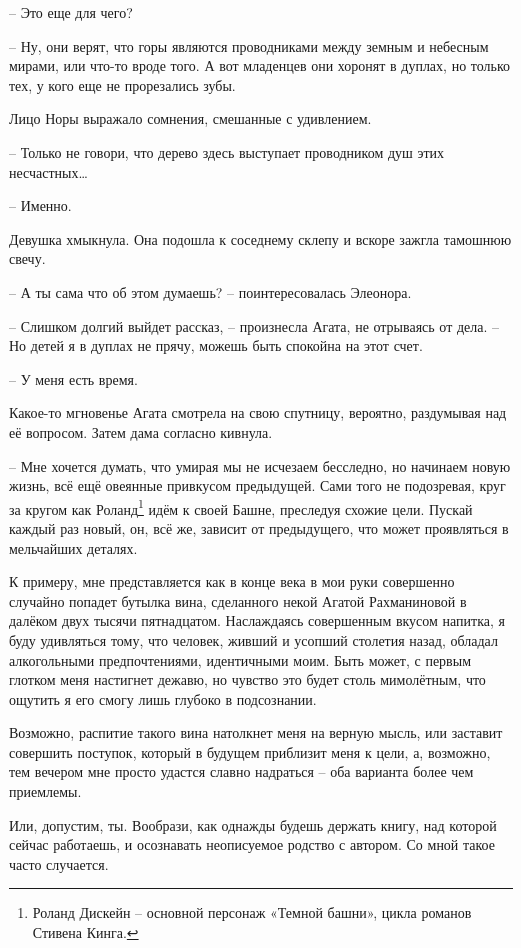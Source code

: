 \documentclass[
  a5paperpaper,
  DIV=11,
  numbers=noendperiod]{scrreprt}
\begin{document}
-- Это еще для чего?

-- Ну, они верят, что горы являются проводниками между земным и небесным
мирами, или что-то вроде того. А вот младенцев они хоронят в дуплах, но
только тех, у кого еще не прорезались зубы.

Лицо Норы выражало сомнения, смешанные с удивлением.

-- Только не говори, что дерево здесь выступает проводником душ этих
несчастных\ldots{}

-- Именно.

Девушка хмыкнула. Она подошла к соседнему склепу и вскоре зажгла
тамошнюю свечу.

-- А ты сама что об этом думаешь? -- поинтересовалась Элеонора.

-- Слишком долгий выйдет рассказ, -- произнесла Агата, не отрываясь от
дела. -- Но детей я в дуплах не прячу, можешь быть спокойна на этот
счет.

-- У меня есть время.

Какое-то мгновенье Агата смотрела на свою спутницу, вероятно, раздумывая
над её вопросом. Затем дама согласно кивнула.

-- Мне хочется думать, что умирая мы не исчезаем бесследно, но начинаем
новую жизнь, всё ещё овеянные привкусом предыдущей. Сами того не
подозревая, круг за кругом как Роланд\footnote{Роланд Дискейн --
  основной персонаж «Темной башни», цикла романов Стивена Кинга.} идём к
своей Башне, преследуя схожие цели. Пускай каждый раз новый, он, всё же,
зависит от предыдущего, что может проявляться в мельчайших деталях.

К примеру, мне представляется как в конце века в мои руки совершенно
случайно попадет бутылка вина, сделанного некой Агатой Рахманиновой в
далёком двух тысячи пятнадцатом. Наслаждаясь совершенным вкусом напитка,
я буду удивляться тому, что человек, живший и усопший столетия назад,
обладал алкогольными предпочтениями, идентичными моим. Быть может, с
первым глотком меня настигнет дежавю, но чувство это будет столь
мимолётным, что ощутить я его смогу лишь глубоко в подсознании.

Возможно, распитие такого вина натолкнет меня на верную мысль, или
заставит совершить поступок, который в будущем приблизит меня к цели, а,
возможно, тем вечером мне просто удастся славно надраться -- оба
варианта более чем приемлемы.

Или, допустим, ты. Вообрази, как однажды будешь держать книгу, над
которой сейчас работаешь, и осознавать неописуемое родство с автором. Со
мной такое часто случается.
\end{document}
